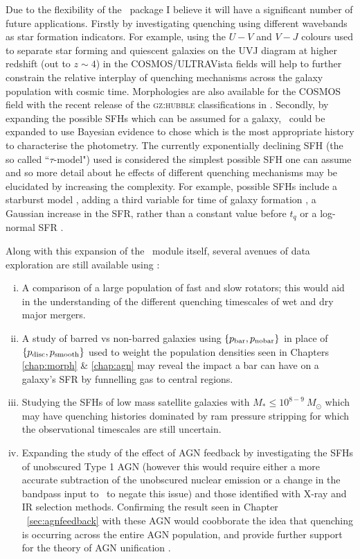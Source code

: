 Due to the flexibility of the \starpy\ package I believe it will have a significant number of future applications. Firstly by investigating quenching using different wavebands as star formation indicators. For example, using the $U-V$ and $V-J$ colours used to separate star forming and quiescent galaxies on the UVJ diagram \citep{ref} at higher redshift (out to $z\sim4$) in the COSMOS/ULTRAVista fields \citep[e.g. see work by][]{muzzin13} will help to further constrain the relative interplay of quenching mechanisms across the galaxy population with cosmic time. Morphologies are also available for the COSMOS field with the recent release of the \textsc{gz:hubble} classifications in \cite{willett16}. Secondly, by expanding the possible SFHs which can be assumed for a galaxy, \starpy\ could be expanded to use Bayesian evidence to chose which is the most appropriate history to characterise the photometry. The currently exponentially declining SFH (the so called ``$\tau$-model") used is considered the simplest possible SFH one can assume and so more detail about he effects of different quenching mechanisms may be elucidated by increasing the complexity. For example, possible SFHs include a starburst model \citep{ref}, adding a third variable for time of galaxy formation \citep{ref}, a Gaussian increase in the SFR, rather than a constant value before $t_q$ or a log-normal SFR \citep{gladders13, abramson16}. 

Along with this expansion of the \starpy\ module itself, several avenues of data exploration are still available using \starpy:
\begin{enumerate}[(i)]
\item A comparison of a large population of fast and slow rotators; this would aid in the understanding of the different quenching timescales of wet and dry major mergers. 
\item A study of barred vs non-barred galaxies using $\{p_{\rm{bar}}, p_{\rm{no bar}}\}$ in place of $\{p_{\rm{disc}}, p_{\rm{smooth}}\}$ used to weight the population densities seen in Chapters \ref{chap:morph} \& \ref{chap:agn} may reveal the impact a bar can have on a galaxy's SFR by funnelling gas to central regions.
\item Studying the SFHs of low mass satellite galaxies with $M_* \leq 10^{8-9} ~M_{\odot}$ which may have quenching histories dominated by ram pressure stripping for which the observational timescales are still uncertain. 
\item Expanding the study of the effect of AGN feedback by investigating the SFHs of unobscured Type 1 AGN (however this would require either a more accurate subtraction of the unobscured nuclear emission or a change in the bandpass input to \starpy\ to negate this issue) and those identified with X-ray and IR selection methods. Confirming the result seen in Chapter ~\ref{sec:agnfeedback} with these AGN would coobborate the idea that quenching is occurring across the entire AGN population, and provide further support for the theory of AGN unification \citep{antonucci93, urry95}.
\end{enumerate}

